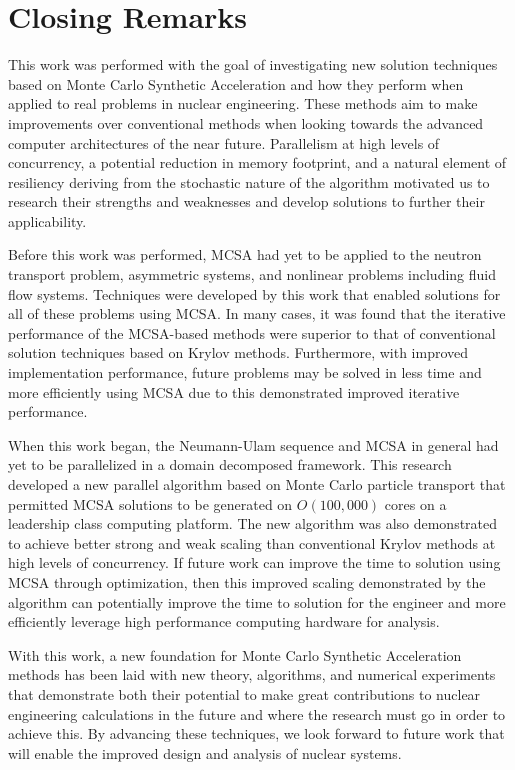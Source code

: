 \section{Closing Remarks\ }
\label{sec:closing}

This work was performed with the goal of investigating new solution
techniques based on Monte Carlo Synthetic Acceleration and how they
perform when applied to real problems in nuclear engineering. These
methods aim to make improvements over conventional methods when
looking towards the advanced computer architectures of the near
future. Parallelism at high levels of concurrency, a potential
reduction in memory footprint, and a natural element of resiliency
deriving from the stochastic nature of the algorithm motivated us to
research their strengths and weaknesses and develop solutions to
further their applicability.

Before this work was performed, MCSA had yet to be applied to the
neutron transport problem, asymmetric systems, and nonlinear problems
including fluid flow systems. Techniques were developed by this work
that enabled solutions for all of these problems using MCSA. In many
cases, it was found that the iterative performance of the MCSA-based
methods were superior to that of conventional solution techniques
based on Krylov methods. Furthermore, with improved implementation
performance, future problems may be solved in less time and more
efficiently using MCSA due to this demonstrated improved iterative
performance.

When this work began, the Neumann-Ulam sequence and MCSA in general
had yet to be parallelized in a domain decomposed framework. This
research developed a new parallel algorithm based on Monte Carlo
particle transport that permitted MCSA solutions to be generated on
$O(100,000)$ cores on a leadership class computing platform. The new
algorithm was also demonstrated to achieve better strong and weak
scaling than conventional Krylov methods at high levels of
concurrency. If future work can improve the time to solution using
MCSA through optimization, then this improved scaling demonstrated by
the algorithm can potentially improve the time to solution for the
engineer and more efficiently leverage high performance computing
hardware for analysis.

With this work, a new foundation for Monte Carlo Synthetic Acceleration
methods has been laid with new theory, algorithms, and numerical
experiments that demonstrate both their potential to make great
contributions to nuclear engineering calculations in the future and
where the research must go in order to achieve this. By advancing
these techniques, we look forward to future work that will enable the
improved design and analysis of nuclear systems.
